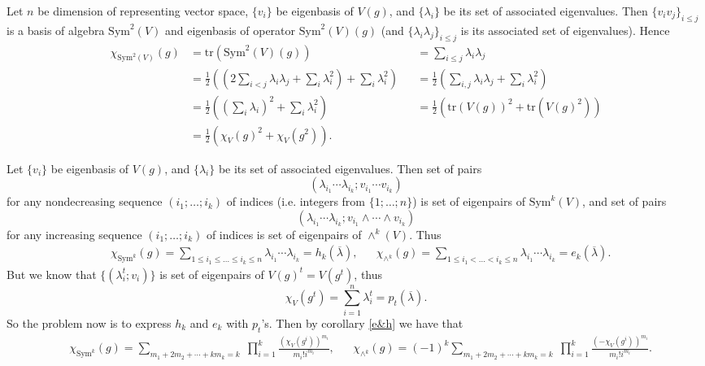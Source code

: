 \documentclass[12pt,a4paper]{article}
\newcommand{\Sym}{\mathrm{Sym}}
\newcommand{\tr}{\mathrm{tr}}
\begin{document}
    \begin{problem}{1}
        Let $n$ be dimension of representing vector space, $\{v_i\}$ be eigenbasis of $V(g)$, and $\{\lambda_i\}$ be its set of associated eigenvalues. Then $\{v_i v_j\}_{i \leqslant j}$ is a basis of algebra $\Sym^2(V)$ and eigenbasis of operator $\Sym^2(V)(g)$ (and $\{\lambda_i \lambda_j\}_{i \leqslant j}$ is its associated set of eigenvalues). Hence
        \begin{align*}
            \chi_{\Sym^2(V)}(g)
            &= \tr(\Sym^2(V)(g))&
            &= \sum_{i \leqslant j} \lambda_i \lambda_j\\
            &= \frac{1}{2}\left(\left(2\sum_{i < j} \lambda_i \lambda_j + \sum_{i} \lambda_i^2\right) + \sum_{i} \lambda_i^2\right)&
            &= \frac{1}{2}\left(\sum_{i, j} \lambda_i \lambda_j + \sum_{i} \lambda_i^2\right)\\
            &= \frac{1}{2}\left(\left(\sum_{i} \lambda_i\right)^2 + \sum_{i} \lambda_i^2\right)&
            &= \frac{1}{2}(\tr(V(g))^2 + \tr(V(g)^2))\\
            &= \frac{1}{2}(\chi_V(g)^2 + \chi_V(g^2)).
        \end{align*}
    \end{problem}

    \begin{problem}{2}
        Let $\{v_i\}$ be eigenbasis of $V(g)$, and $\{\lambda_i\}$ be its set of associated eigenvalues. Then set of pairs
        \[(\lambda_{i_1} \cdots \lambda_{i_k}; v_{i_1} \cdots v_{i_k})\]
        for any nondecreasing sequence $(i_1; \dots; i_k)$ of indices (i.e. integers from $\{1; \dots; n\}$) is set of eigenpairs of $\Sym^k(V)$, and set of pairs
        \[(\lambda_{i_1} \cdots \lambda_{i_k}; v_{i_1} \wedge \cdots \wedge v_{i_k})\]
        for any increasing sequence $(i_1; \dots; i_k)$ of indices is set of eigenpairs of $\wedge^k(V)$. Thus
        \begin{align*}
            &\chi_{\Sym^k}(g) = \sum_{1 \leqslant i_1 \leqslant \dots \leqslant i_k \leqslant n} \lambda_{i_1} \cdots \lambda_{i_k} = h_k(\overline{\lambda}),&
            &\chi_{\wedge^k}(g) = \sum_{1 \leqslant i_1 < \dots < i_k \leqslant n} \lambda_{i_1} \cdots \lambda_{i_k} = e_k(\overline{\lambda}).
        \end{align*}
        But we know that $\{(\lambda_i^t; v_i)\}$ is set of eigenpairs of $V(g)^t = V(g^t)$, thus
        \[\chi_{V}(g^t) = \sum_{i=1}^n \lambda_i^t = p_t(\overline{\lambda}).\]
        So the problem now is to express $h_k$ and $e_k$ with $p_t$'s. Then by corollary \ref{e&h} we have that
        \begin{align*}
            &\chi_{\Sym^k}(g) = \sum_{m_1 + 2 m_2 + \cdots + k m_k = k} \; \prod_{i=1}^k \frac{(\chi_V(g^i))^{m_i}}{m_i! i^{m_i}},&
            &\chi_{\wedge^k}(g) = (-1)^k \sum_{m_1 + 2 m_2 + \cdots + k m_k = k} \; \prod_{i=1}^k \frac{(-\chi_V(g^i))^{m_i}}{m_i! i^{m_i}}.
        \end{align*}
    \end{problem}
\end{document}
